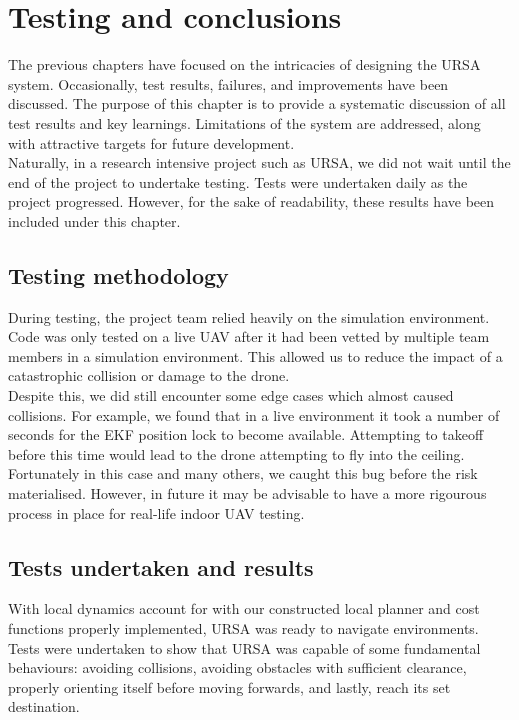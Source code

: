 \documentclass[capstone_report.tex]{subfiles}
\begin{document}
\chapter{Testing and conclusions}
The previous chapters have focused on the intricacies of designing the URSA system. Occasionally, test results, failures, and improvements have been discussed. The purpose of this chapter is to provide a systematic discussion of all test results and key learnings. Limitations of the system are addressed, along with attractive targets for future development.\\

Naturally, in a research intensive project such as URSA, we did not wait until the end of the project to undertake testing. Tests were undertaken daily as the project progressed. However, for the sake of readability, these results have been included under this chapter.

\pagebreak

\section{Testing methodology}
During testing, the project team relied heavily on the simulation environment. Code was only tested on a live UAV after it had been vetted by multiple team members in a simulation environment. This allowed us to reduce the impact of a catastrophic collision or damage to the drone.\\

Despite this, we did still encounter some edge cases which almost caused collisions. For example, we found that in a live environment it took a number of seconds for the EKF position lock to become available. Attempting to takeoff before this time would lead to the drone attempting to fly into the ceiling. Fortunately in this case and many others, we caught this bug before the risk materialised. However, in future it may be advisable to have a more rigourous process in place for real-life indoor UAV testing.


\section{Tests undertaken and results}
With local dynamics account for with our constructed local planner and cost functions properly implemented, URSA was ready to navigate environments. Tests were undertaken to show that URSA was capable of some fundamental behaviours: avoiding collisions, avoiding obstacles with sufficient clearance, properly orienting itself before moving forwards, and lastly, reach its set destination. \\
\end{document}
